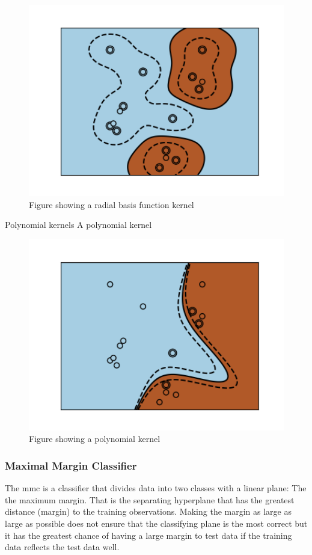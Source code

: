 \documentclass[11pt]{article}
\begin{document}
\begin{figure}[ht]
  \centering
  \includegraphics[width=12cm]{graphics/kernel_rbf.png}
  \caption{Figure showing a radial basis function kernel}
\end{figure}

\large{Polynomial kernels}
A polynomial kernel

\begin{figure}[ht]
  \centering
  \includegraphics[width=12cm]{graphics/kernel_poly.png}
  \caption{Figure showing a polynomial kernel}
\end{figure}

\subsubsection{Maximal Margin Classifier}
The \gls{mmc} is a classifier that divides data into two classes with a linear plane: The the maximum margin. That is the separating hyperplane that has the greatest distance (margin) to the training observations. Making the margin as large as large as possible does not ensure that the classifying plane is the most correct but it has the greatest chance of having a large margin to test data if the training data reflects the test data well.\cite{jamesSupportVectorMachines}\cite{HyperplaneSeparationTheorem2021}
\end{document}
